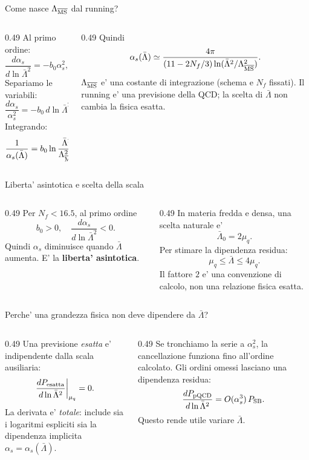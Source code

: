 \begin{frame}{Come nasce $\Lambda_{\overline{\rm MS}}$ dal running?}
\small
\begin{columns}[T,onlytextwidth]
\begin{column}{0.49\textwidth}
Al primo ordine:
\[
\frac{d\alpha_s}{d\ln\bar\Lambda^2}
=-b_0\alpha_s^2,
\qquad
b_0=\frac{11-2N_f/3}{4\pi}.
\]
Separiamo le variabili:
\[
\frac{d\alpha_s}{\alpha_s^2}
=-b_0\,d\ln\bar\Lambda^2.
\]
Integrando:
\[
\frac1{\alpha_s(\bar\Lambda)}
=b_0\ln\frac{\bar\Lambda^2}
{\Lambda_{\overline{\rm MS}}^2}.
\]
\end{column}
\begin{column}{0.49\textwidth}
Quindi
\[
\alpha_s(\bar\Lambda)\simeq
\frac{4\pi}{(11-2N_f/3)
\ln(\bar\Lambda^2/\Lambda_{\overline{\rm MS}}^2)}.
\]
$\Lambda_{\overline{\rm MS}}$ e' una costante
di integrazione (schema e $N_f$ fissati).
\medskip
Il running e' una previsione della QCD;
la scelta di $\bar\Lambda$ non cambia
la fisica esatta.
\end{column}
\end{columns}
\end{frame}

\begin{frame}{Liberta' asintotica e scelta della scala}
\small
\begin{columns}[T,onlytextwidth]
\begin{column}{0.49\textwidth}
Per $N_f<16.5$, al primo ordine
\[
b_0>0,
\quad
\frac{d\alpha_s}{d\ln\bar\Lambda^2}<0.
\]
Quindi $\alpha_s$ diminuisce quando
$\bar\Lambda$ aumenta.
\medskip
E' la \textbf{liberta' asintotica}.
\end{column}
\begin{column}{0.49\textwidth}
In materia fredda e densa, una scelta naturale e'
\[
\bar\Lambda_0=2\mu_q.
\]
Per stimare la dipendenza residua:
\[
\mu_q\leq\bar\Lambda\leq4\mu_q.
\]
Il fattore $2$ e' una convenzione di calcolo,
non una relazione fisica esatta.
\end{column}
\end{columns}
\end{frame}

\begin{frame}{Perche' una grandezza fisica non deve dipendere da $\bar\Lambda$?}
\small
\begin{columns}[T,onlytextwidth]
\begin{column}{0.49\textwidth}
Una previsione \emph{esatta} e' indipendente
dalla scala ausiliaria:
\[
\left.\frac{dP_{\rm esatta}}{d\ln\bar\Lambda^2}
\right|_{\mu_q}=0.
\]
La derivata e' \emph{totale}:
include sia i logaritmi espliciti sia
la dipendenza implicita
$\alpha_s=\alpha_s(\bar\Lambda)$.
\end{column}
\begin{column}{0.49\textwidth}
Se tronchiamo la serie a $\alpha_s^2$,
la cancellazione funziona fino
all'ordine calcolato.
\medskip
Gli ordini omessi lasciano una dipendenza
residua:
\[
\frac{dP_{\rm pQCD}}{d\ln\bar\Lambda^2}
=O(\alpha_s^3)\,P_{\rm SB}.
\]
Questo rende utile variare $\bar\Lambda$.
\end{column}
\end{columns}
\end{frame}

